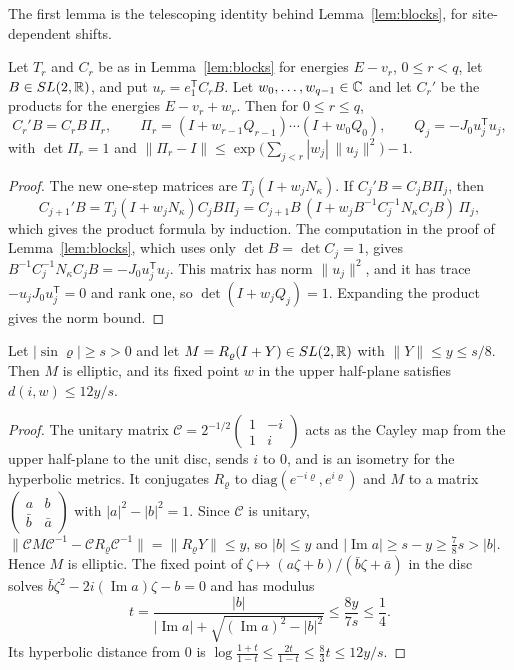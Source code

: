 The first lemma is the telescoping identity behind Lemma~\ref{lem:blocks}, for site-dependent shifts.

\begin{lemma}[Insertion]\label{lem:insert}
Let $T_r$ and $C_r$ be as in Lemma~\ref{lem:blocks} for energies $E-v_r$, $0\le r<q$, let $B\in SL(2,\mathbb R)$, and put $u_r=e_1^{\mathsf T}C_rB$. Let $w_0,\dots,w_{q-1}\in\mathbb C$ and let $C_r'$ be the products for the energies $E-v_r+w_r$. Then for $0\le r\le q$,
\[
C_r'B=C_rB\,\Pi_r,\qquad\Pi_r=(I+w_{r-1}Q_{r-1})\cdots(I+w_0Q_0),\qquad Q_j=-J_0u_j^{\mathsf T}u_j,
\]
with $\det\Pi_r=1$ and $\|\Pi_r-I\|\le\exp\bigl(\sum_{j<r}|w_j|\,\|u_j\|^2\bigr)-1$.
\end{lemma}

\begin{proof}
The new one-step matrices are $T_j(I+w_jN_\kappa)$. If $C_j'B=C_jB\Pi_j$, then
\[
C_{j+1}'B=T_j(I+w_jN_\kappa)C_jB\Pi_j=C_{j+1}B\,(I+w_jB^{-1}C_j^{-1}N_\kappa C_jB)\,\Pi_j ,
\]
which gives the product formula by induction. The computation in the proof of Lemma~\ref{lem:blocks}, which uses only $\det B=\det C_j=1$, gives $B^{-1}C_j^{-1}N_\kappa C_jB=-J_0u_j^{\mathsf T}u_j$. This matrix has norm $\|u_j\|^2$, and it has trace $-u_jJ_0u_j^{\mathsf T}=0$ and rank one, so $\det(I+w_jQ_j)=1$. Expanding the product gives the norm bound.
\end{proof}

\begin{lemma}\label{lem:rot}
Let $|\sin\varrho|\ge s>0$ and let $M=R_\varrho(I+Y)\in SL(2,\mathbb R)$ with $\|Y\|\le y\le s/8$. Then $M$ is elliptic, and its fixed point $w$ in the upper half-plane satisfies $d(i,w)\le12y/s$.
\end{lemma}

\begin{proof}
The unitary matrix $\mathcal C=2^{-1/2}\begin{pmatrix}1&-i\\1&i\end{pmatrix}$ acts as the Cayley map from the upper half-plane to the unit disc, sends $i$ to $0$, and is an isometry for the hyperbolic metrics. It conjugates $R_\varrho$ to $\mathrm{diag}(e^{-i\varrho},e^{i\varrho})$ and $M$ to a matrix $\begin{pmatrix}a&b\\\bar b&\bar a\end{pmatrix}$ with $|a|^2-|b|^2=1$. Since $\mathcal C$ is unitary, $\|\mathcal CM\mathcal C^{-1}-\mathcal CR_\varrho\mathcal C^{-1}\|=\|R_\varrho Y\|\le y$, so $|b|\le y$ and $|\operatorname{Im}a|\ge s-y\ge\frac78s>|b|$. Hence $M$ is elliptic. The fixed point of $\zeta\mapsto(a\zeta+b)/(\bar b\zeta+\bar a)$ in the disc solves $\bar b\zeta^2-2i(\operatorname{Im}a)\zeta-b=0$ and has modulus
\[
t=\frac{|b|}{|\operatorname{Im}a|+\sqrt{(\operatorname{Im}a)^2-|b|^2}}\le\frac{8y}{7s}\le\frac14 .
\]
Its hyperbolic distance from $0$ is $\log\frac{1+t}{1-t}\le\frac{2t}{1-t}\le\frac83t\le12y/s$.
\end{proof}

